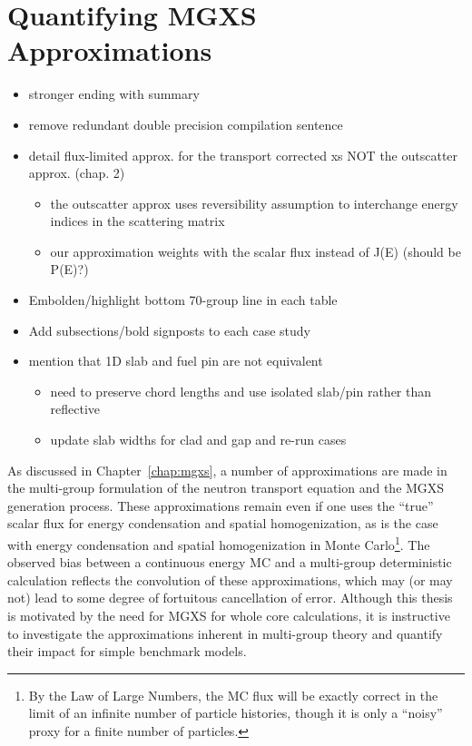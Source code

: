 \chapter{Quantifying MGXS Approximations}
\label{chap:biases}

\begin{itemize}[noitemsep]
  \item stronger ending with summary
  \item remove redundant double precision compilation sentence
  \item detail flux-limited approx. for the transport corrected xs NOT the outscatter approx. (chap. 2)
  \begin{itemize}[noitemsep]
    \item the outscatter approx uses reversibility assumption to interchange energy indices in the scattering matrix
    \item our approximation weights with the scalar flux instead of J(E) (should be P(E)?)
  \end{itemize}
  \item Embolden/highlight bottom 70-group line in each table
  \item Add subsections/bold signposts to each case study
  \item mention that 1D slab and fuel pin are not equivalent
  \begin{itemize}
    \item need to preserve chord lengths and use isolated slab/pin rather than reflective
    \item update slab widths for clad and gap and re-run cases
  \end{itemize}
\end{itemize}

As discussed in Chapter~\ref{chap:mgxs}, a number of approximations are made in the multi-group formulation of the neutron transport equation and the \ac{MGXS} generation process. These approximations remain even if one uses the ``true'' scalar flux for energy condensation and spatial homogenization, as is the case with energy condensation and spatial homogenization in Monte Carlo\footnote{By the Law of Large Numbers, the \ac{MC} flux will be exactly correct in the limit of an infinite number of particle histories, though it is only a ``noisy'' proxy for a finite number of particles.}. The observed bias between a continuous energy \ac{MC} and a multi-group deterministic calculation reflects the convolution of these approximations, which may (or may not) lead to some degree of fortuitous cancellation of error. Although this thesis is motivated by the need for \ac{MGXS} for whole core calculations, it is instructive to investigate the approximations inherent in multi-group theory and quantify their impact for simple benchmark models.

